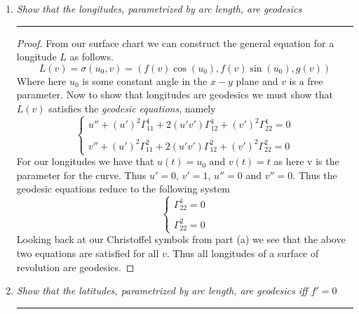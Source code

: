 \documentclass[a4paper, 11pt]{article}
\begin{document}
\begin{enumerate}[label=\alph*]
		\item \textit{Show that the longitudes, parametrized by arc length, are geodesics}
		\par\noindent\rule{\textwidth}{0.4pt}
			\begin{proof}
				From our surface chart we can construct the general equation for a longitude $L$ as follows. 
					\begin{equation*}
						L(v) = \sigma(u_0,v) = (f(v)\cos(u_0),f(v)\sin(u_0), g(v))
					\end{equation*}
				Where here $u_0$ is some constant angle in the $x-y$ plane and $v$ is a free parameter. Now to show that longitudes are geodesics we must show that $L(v)$ satisfies the \textit{geodesic equations}, namely
					\begin{equation*}
						\begin{cases}
							u''+(u')^2\Gamma_{11}^1+2(u'v')\Gamma_{12}^1+(v')^2\Gamma_{22}^1 = 0 \\ 
							\quad \\ 
							v''+(u')^2\Gamma_{11}^2+2(u'v')\Gamma_{12}^2+(v')^2\Gamma_{22}^2 = 0
						\end{cases}
					\end{equation*}
				For our longitudes we have that $u(t) = u_0$ and $v(t) = t$ as here v is the parameter for the curve. Thus $u' = 0$, $v' = 1$, $u'' =0$ and $v''=0$. Thus the geodesic equations reduce to the following system
					\begin{equation*}
						\begin{cases}
							\Gamma_{22}^1 = 0 \\ 
							\quad \\ 
							\Gamma_{22}^2 = 0
						\end{cases}
					\end{equation*}
				Looking back at our Christoffel symbols from part (a) we see that the above two equations are satisfied for all $v$. Thus all longitudes of a surface of revolution are geodesics. 
			\end{proof}
		
		\item \textit{Show that the latitudes, parametrized by arc length, are geodesics iff $f'=0$}
		\par\noindent\rule{\textwidth}{0.4pt}
		

\end{enumerate}
\end{document}
